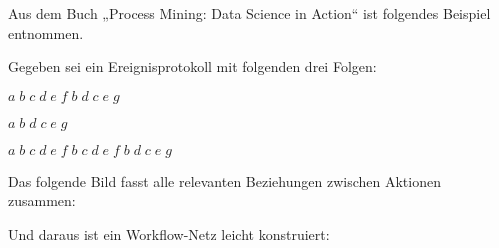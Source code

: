 \vspace{\baselineskip} %

Aus dem Buch „Process Mining: Data Science in Action“ \cite{aal16} ist folgendes Beispiel entnommen.

Gegeben sei ein Ereignisprotokoll mit folgenden drei Folgen:

\begin{center}
	\parbox{6cm}{
		$ a \; b \; c \; d \; e \; f \; b \; d \; c \; e \; g $
		
		$ a \; b \; d \; c \; e \; g$
		
		$ a \; b \; c \; d \; e \; f \; b \; c \; d \; e \; f \; b \; d \; c \; e \; g $
	}
\end{center}

\clearpage %

Das folgende Bild fasst alle relevanten Beziehungen zwischen Aktionen zusammen:

\begin{center}
\end{center}

Und daraus ist ein Workflow-Netz leicht konstruiert:

\vspace{-\baselineskip}

